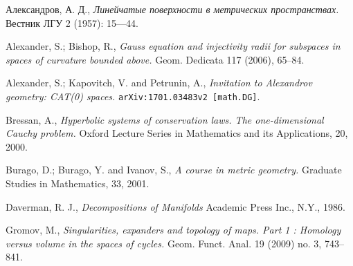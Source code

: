 \documentclass{article}
\begin{document}
\begin{thebibliography}{52}

\begin{otherlanguage}{russian}
Александров, А. Д., 
\textit{Линейчатые поверхности в метрических пространствах.}
Вестник ЛГУ 2 (1957): 15---44.
\end{otherlanguage}


 Alexander, S.; Bishop, R., \textit{Gauss equation and injectivity radii for subspaces in spaces of curvature bounded above.} 
Geom. Dedicata 117 (2006), 65--84. 


Alexander, S.; Kapovitch, V. and Petrunin, A.,
\textit{Invitation to Alexandrov geometry: CAT(0) spaces.}
\texttt{arXiv:1701.03483v2 [math.DG]}.


 Bressan, A.,
\textit{Hyperbolic systems of conservation laws.
The one-dimensional Cauchy problem.}
Oxford Lecture Series in Mathematics and its Applications, 20, 2000.

Burago, D.; Burago, Y. and Ivanov, S.,
\textit{A course in metric geometry.}
Graduate Studies in Mathematics, 33, 2001.


 Daverman, R. J.,
\textit{Decompositions of Manifolds}
Academic Press Inc., N.Y., 1986.

 Gromov, M., \textit{Singularities, expanders and topology of maps. Part 1 : Homology versus volume in the spaces of cycles.} Geom. Funct. Anal. 19 (2009) no. 3, 743--841.







\end{thebibliography}
\end{document}
